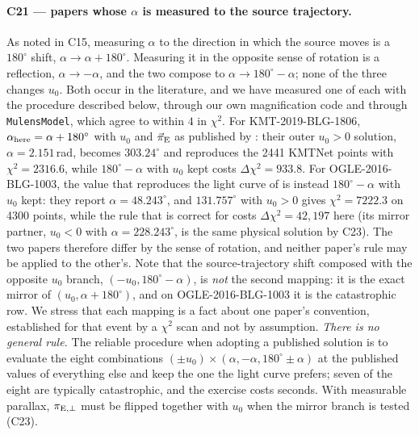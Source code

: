 \paragraph{C21 --- papers whose $\alpha$ is measured to the source
trajectory.}  As noted in C15, measuring $\alpha$ to the direction in which
the source moves is a $180^\circ$ shift, $\alpha \rightarrow \alpha +
180^\circ$.  Measuring it in the opposite sense of rotation is a reflection,
$\alpha \rightarrow -\alpha$, and the two compose to $\alpha \rightarrow
180^\circ - \alpha$; none of the three changes $u_0$.  Both occur in the
literature, and we have measured one of each with the procedure described
below, through our own magnification code and through
\texttt{MulensModel}, which agree to within $4$ in $\chi^2$.  For
KMT-2019-BLG-1806, $\alpha_{\rm here} = \alpha + 180^\circ$ with $u_0$ and
$\vec{\pi}_{\rm E}$ as published by \citet{Zang:2023}: their outer $u_0 > 0$
solution, $\alpha = 2.151$\,rad, becomes $303.24^\circ$ and reproduces the
2441 KMTNet points with $\chi^2 = 2316.6$, while $180^\circ - \alpha$ with
$u_0$ kept costs $\Delta\chi^2 = 933.8$.  For OGLE-2016-BLG-1003, the
value that reproduces the light curve of \citet{Jung:2017} is instead
$180^\circ - \alpha$ with $u_0$ kept: they report $\alpha = 48.243^\circ$,
and $131.757^\circ$ with $u_0 > 0$ gives $\chi^2 = 7222.3$ on 4300 points,
while the rule that is correct for \citeauthor{Zang:2023} costs
$\Delta\chi^2 = 42{,}197$ here (its mirror partner, $u_0 < 0$ with $\alpha =
228.243^\circ$, is the same physical solution by C23).  The two papers
therefore differ by the sense of rotation, and neither paper's rule may be
applied to the other's.  Note that the source-trajectory shift composed with
the opposite $u_0$ branch, $(-u_0, 180^\circ - \alpha)$, is \emph{not} the
second mapping: it is the exact mirror of $(u_0, \alpha + 180^\circ)$, and
on OGLE-2016-BLG-1003 it is the catastrophic row.  We stress that each
mapping is a fact about one paper's convention, established for that event
by a $\chi^2$ scan and not by assumption.  \emph{There is no general rule.}
The reliable procedure when adopting a published solution is to evaluate
the eight combinations $(\pm u_0) \times (\alpha, -\alpha, 180^\circ \pm
\alpha)$ at the published values of everything else and keep the one the
light curve prefers; seven of the eight are typically catastrophic, and the
exercise costs seconds.  With measurable parallax, $\pi_{{\rm E},\perp}$
must be flipped together with $u_0$ when the mirror branch is tested (C23).

